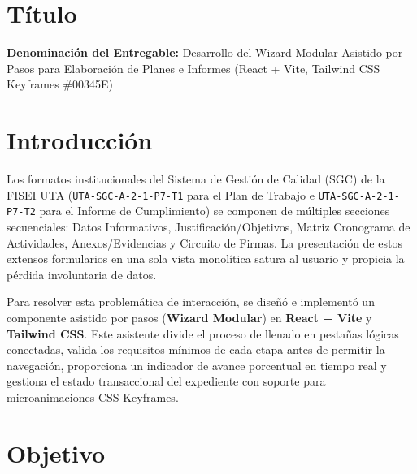 \documentclass[12pt,a4paper]{article}
\begin{document}

\vspace{0.25cm}
\section{Título}
\textbf{Denominación del Entregable:} Desarrollo del Wizard Modular Asistido por Pasos para Elaboración de Planes e Informes (React + Vite, Tailwind CSS Keyframes \#00345E)



\section{Introducción}
Los formatos institucionales del Sistema de Gestión de Calidad (SGC) de la FISEI UTA (\texttt{UTA-SGC-A-2-1-P7-T1} para el Plan de Trabajo e \texttt{UTA-SGC-A-2-1-P7-T2} para el Informe de Cumplimiento) se componen de múltiples secciones secuenciales: Datos Informativos, Justificación/Objetivos, Matriz Cronograma de Actividades, Anexos/Evidencias y Circuito de Firmas. La presentación de estos extensos formularios en una sola vista monolítica satura al usuario y propicia la pérdida involuntaria de datos.

Para resolver esta problemática de interacción, se diseñó e implementó un componente asistido por pasos (\textbf{Wizard Modular}) en \textbf{React + Vite} y \textbf{Tailwind CSS}. Este asistente divide el proceso de llenado en pestañas lógicas conectadas, valida los requisitos mínimos de cada etapa antes de permitir la navegación, proporciona un indicador de avance porcentual en tiempo real y gestiona el estado transaccional del expediente con soporte para microanimaciones CSS Keyframes.

\section{Objetivo}
\end{document}
